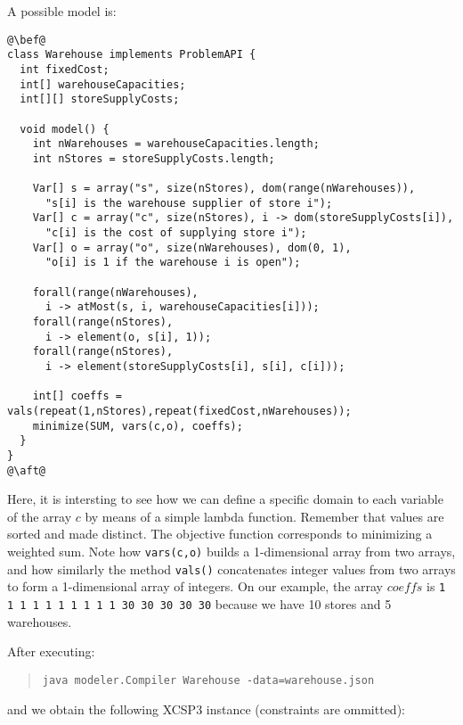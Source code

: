 \documentclass[10pt]{article}
\def\xt{{\rm XCSP3}\xspace}
\newcommand{\nn}[1]{{\tt #1}} %
\def\xt{{\rm XCSP3}\xspace}
\begin{document}
A possible model is:

\begin{lstlisting}
@\bef@
class Warehouse implements ProblemAPI {
  int fixedCost;
  int[] warehouseCapacities;
  int[][] storeSupplyCosts;
  
  void model() {
    int nWarehouses = warehouseCapacities.length;
    int nStores = storeSupplyCosts.length;
    
    Var[] s = array("s", size(nStores), dom(range(nWarehouses)),
      "s[i] is the warehouse supplier of store i");
    Var[] c = array("c", size(nStores), i -> dom(storeSupplyCosts[i]),
      "c[i] is the cost of supplying store i");
    Var[] o = array("o", size(nWarehouses), dom(0, 1),
      "o[i] is 1 if the warehouse i is open");
    
    forall(range(nWarehouses),
      i -> atMost(s, i, warehouseCapacities[i]));
    forall(range(nStores),
      i -> element(o, s[i], 1));
    forall(range(nStores),
      i -> element(storeSupplyCosts[i], s[i], c[i]));

    int[] coeffs = vals(repeat(1,nStores),repeat(fixedCost,nWarehouses));
    minimize(SUM, vars(c,o), coeffs); 
  }
}
@\aft@
\end{lstlisting}

Here, it is intersting to see how we can define a specific domain to each variable of the array $c$ by means of a simple lambda function.
Remember that values are sorted and made distinct. 
The objective function corresponds to minimizing a weighted sum.
Note how \verb!vars(c,o)! builds a 1-dimensional array from two arrays, and how similarly the method \nn{vals()} concatenates integer values from two arrays to form a 1-dimensional array of integers.
On our example, the array $coeffs$ is \verb!1 1 1 1 1 1 1 1 1 1 30 30 30 30 30! because we have 10 stores and 5 warehouses.


After executing:
\begin{quote}
\begin{verbatim}
java modeler.Compiler Warehouse -data=warehouse.json
\end{verbatim}
\end{quote}
and we obtain the following \xt instance (constraints are ommitted):
\end{document}
